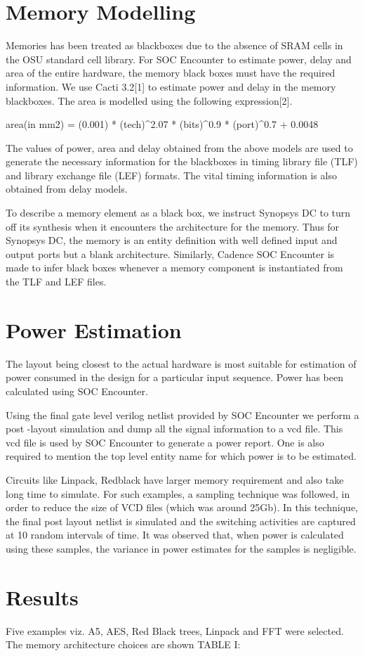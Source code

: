 \section{Memory Modelling}
Memories has been treated as blackboxes due to the absence of SRAM cells in the OSU standard cell library.
For SOC Encounter to estimate power, delay and area of the entire hardware, the memory black boxes must have the required information. We use Cacti 3.2[1] to estimate power and delay in the memory blackboxes. The area is modelled using the following expression[2].

area(in mm2) = (0.001){ * }(tech)^{2.07} { * } (bits)^{0.9} { * } (port)^{0.7} + {0.0048}

The values of power, area and delay obtained from the above models are used to generate the necessary information for the blackboxes in timing library file (TLF) and library exchange file (LEF) formats. The vital timing information is also obtained from delay models. 

To describe a memory element as a black box, we instruct Synopsys DC to turn off its synthesis when it encounters the architecture for the memory.
Thus for Synopsys DC, the memory is an entity definition with well defined input and output ports but a blank architecture.
Similarly, Cadence SOC Encounter is made to infer black boxes whenever a memory component is instantiated from the TLF and LEF files.

\section{Power Estimation}
The layout being closest to the actual hardware is most suitable for estimation of power consumed in the design for a particular input sequence.
Power has been calculated using SOC Encounter.

Using the final gate level verilog netlist provided by SOC Encounter we perform a post -layout simulation and dump all the signal information to a vcd file. This vcd file is used by SOC Encounter to generate a power report. One is also required to mention the top level entity name for which power is to be estimated.

Circuits like Linpack, Redblack have larger memory requirement and also take long time to simulate. For such examples, a sampling technique was followed, in order to reduce the size of VCD files (which was around 25Gb). In this technique, the final post layout netlist is simulated and the switching activities are captured at 10 random intervals of time. It was observed that, when power is calculated using these samples, the variance in power estimates for the samples is negligible.  

\section{Results}
Five examples viz. A5, AES, Red Black trees, Linpack and FFT were selected. 
The memory architecture choices are shown TABLE I:
